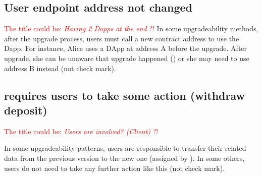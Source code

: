 
\subsection{User endpoint address not changed}
\textcolor{red}{The title could be: \textit{Having 2 Dapps at the end} ?!}
In some upgradeability methods, after the upgrade process, users must call a new contract address to use the Dapp. For instance, Alice uses a DApp at address A before the upgrade. After upgrade, she can be unaware that upgrade happened (\checkmark) or she may need to use address B instead (not check mark).


\subsection{requires users to take some action (withdraw deposit)}
\textcolor{red}{The title could be: \textit{Users are involved? (Client)} ?!}

In some upgradeability patterns, users are responsible to transfer their related data from the previous version to the new one (assigned by \checkmark). In some others, users do not need to take any further action like this (not check mark). 

 
